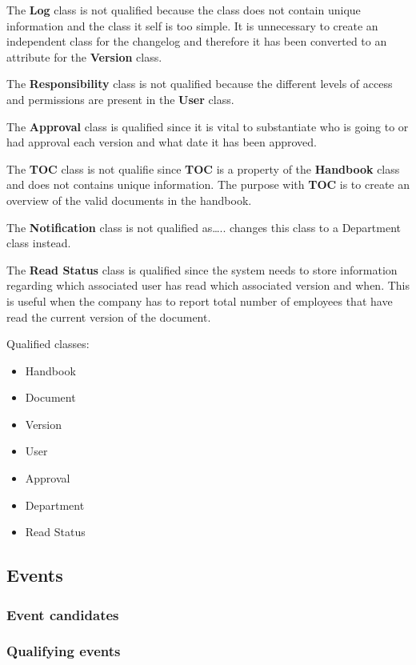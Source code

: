 The \textbf{Log} class is not qualified because the class does not contain unique information and the class it self is too simple. It is unnecessary to create an independent class for the changelog and therefore it has been converted to an attribute for the \textbf{Version} class.
 
The \textbf{Responsibility} class is not qualified because the different levels of access and permissions are present in the \textbf{User} class.

The \textbf{Approval} class is qualified since it is vital to substantiate who is going to or had approval each version and what date it has been approved. 

The \textbf{TOC} class is not qualifie since \textbf{TOC} is a property of the \textbf{Handbook} class and does not contains unique information. The purpose with \textbf{TOC} is to create an overview of the valid documents in the handbook.

The \textbf{Notification} class is not qualified as…..  changes this class to a Department class instead.

The \textbf{Read Status} class is qualified since the system needs to store information regarding which associated user has read which associated version and when. This is useful when the company has to report total number of employees that have read the current version of the document.

Qualified classes:
\begin{itemize}
  \item Handbook
  \item Document
  \item Version
  \item User
  \item Approval
  \item Department
  \item Read Status
\end{itemize}

\subsection{Events}
\subsubsection{Event candidates}
\subsubsection{Qualifying events}

